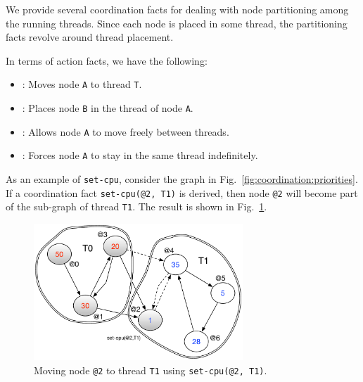 We provide several coordination facts for dealing with node partitioning among
the running threads. Since each node is placed in some thread, the partitioning
facts revolve around thread placement.

In terms of action facts, we have the
following:

\begin{itemize}
   \item {}: Moves node \texttt{A} to thread
   \texttt{T}.

   \item {}: Places node \texttt{B} in
   the thread of node \texttt{A}.

   \item {}: Allows node \texttt{A} to move freely
   between threads.

   \item {}: Forces node \texttt{A} to stay in the
   same thread indefinitely.

\end{itemize}

As an example of \texttt{set-cpu}, consider the graph in
Fig.~\ref{fig:coordination:priorities}. If a coordination fact
\texttt{set-cpu(@2, T1)} is derived, then node \texttt{@2} will become part of
the sub-graph of thread \texttt{T1}. The result is shown in
Fig.~\ref{fig:coordination:partitioning}.

\begin{figure}
\begin{center}
   \includegraphics[width=0.7\textwidth]{figures/coordination/partitioning.pdf}
\end{center}
\caption{Moving node \texttt{@2} to thread \texttt{T1} using
   \texttt{set-cpu(@2, T1)}.}
\label{fig:coordination:partitioning}
\end{figure}


